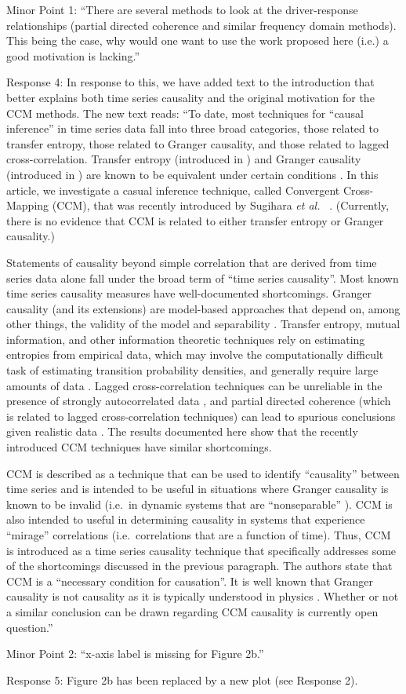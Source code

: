 \documentclass[]{article}
\begin{document}
Minor Point 1: ``There are several methods to look at the driver-response relationships (partial directed coherence and similar frequency domain methods).  This being the case, why would one want to use the work proposed here  (i.e.) a good motivation is lacking.''

Response 4:  In response to this, we have added text to the introduction that better explains both time series causality and the original motivation for the CCM methods.  The new text reads: ``To date, most techniques for ``causal inference'' in time series data fall into three broad categories, those related to transfer entropy, those related to Granger causality, and those related to lagged cross-correlation.  Transfer entropy (introduced in \cite{Schreiber2000}) and Granger causality (introduced in \cite{granger1969}) are known to be equivalent under certain conditions \cite{Barnett2009}.  In this article, we investigate a casual inference technique, called Convergent Cross-Mapping (CCM), that was recently introduced by Sugihara {\em et al.\ } \cite{Sugihara2012}.  (Currently, there is no evidence that CCM is related to either transfer entropy or Granger causality.)

Statements of causality beyond simple correlation that are derived from time series data alone fall under the broad term of ``time series causality''.  Most known time series causality measures have well-documented shortcomings.  Granger causality (and its extensions) are model-based approaches that depend on, among other things, the validity of the model \cite{Kaminski2001,Granger1980} and separability \cite{Sugihara2012}.  Transfer entropy, mutual information, and other information theoretic techniques rely on estimating entropies from empirical data, which may involve the computationally difficult task of estimating transition probability densities, and generally require large amounts of data \cite{Kaiser2002,Schindler2007}.  Lagged cross-correlation techniques can be unreliable in the presence of strongly autocorrelated data \cite{box2013}, and partial directed coherence (which is related to lagged cross-correlation techniques) can lead to spurious conclusions given realistic data \cite{pascual2014}.  The results documented here show that the recently introduced CCM techniques have similar shortcomings.  

CCM is described as a technique that can be used to identify ``causality'' between time series and is intended to be useful in situations where Granger causality is known to be invalid (i.e.\ in dynamic systems that are ``nonseparable'' \cite{Sugihara2012}).  CCM is also intended to useful in determining causality in systems that experience ``mirage'' correlations \cite{Sugihara2012} (i.e.\ correlations that are a function of time).  Thus, CCM is introduced as a time series causality technique that specifically addresses some of the shortcomings discussed in the previous paragraph.  The authors state that CCM is a ``necessary condition for causation''.  It is well known that Granger causality is not causality as it is typically understood in physics \cite{Granger1980,liu2012,Roberts1985}.  Whether or not a similar conclusion can be drawn regarding CCM causality is currently open question.''

Minor Point 2:  ``x-axis label is missing for Figure 2b.''

Response 5:  Figure 2b has been replaced by a new plot (see Response 2).
\end{document}
